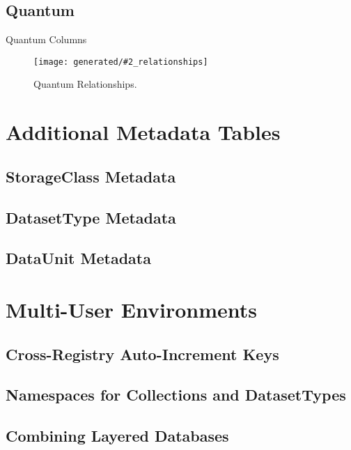 \documentclass[DM,toc]{lsstdoc}
\newcommand{\coltable}[1]{
    \begin{table}
        {\footnotesize
        }
        \caption{#1 Columns}
        \label{tbl:#1}
    \end{table}
}
\newcommand{\relgraph}[2][width=0.8\textwidth]{
    \begin{figure}
        \centering
        \texttt{[image: generated/\#2\_relationships]}
        \caption{#2 Relationships.}
        \label{rel:#2}
    \end{figure}
}
\begin{document}
\subsection{Quantum}
\label{sec:quantum}

\coltable{Quantum}
\relgraph{Quantum}

\section{Additional Metadata Tables}
\label{sec:additional-metadata-tables}

\subsection{StorageClass Metadata}
\label{sec:storageclass-metadata}

\subsection{DatasetType Metadata}
\label{sec:datasettype-metadata}

\subsection{DataUnit Metadata}
\label{sec:dataunit-metadata}


\section{Multi-User Environments}
\label{sec:multi-user-environments}

\subsection{Cross-Registry Auto-Increment Keys}
\label{sec:cross-registry-auto-increment-keys}

\subsection{Namespaces for Collections and DatasetTypes}
\label{sec:namespaces-for-collections-and-datasettypes}

\subsection{Combining Layered Databases}
\label{sec:layered-databases}
\end{document}
